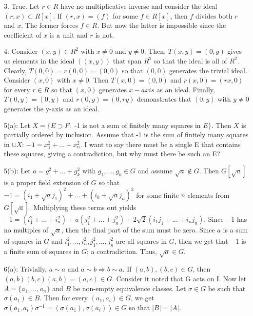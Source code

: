 \documentclass[12pt]{article}
\begin{document}
3. True. Let $r \in R$ have no multiplicative inverse and consider the ideal $(r,x) \subset R[x]$. If $(r,x)=(f)$ for some $f \in R[x]$, then $f$ divides both $r$ and $x$. The former forces $f \in R$. But now the latter is impossible since the coefficient of $x$ is a unit and $r$ is not. \newline

4: Consider $(x,y) \in R^2$ with $x \neq 0$ and $y \neq 0$. Then, $T(x,y)=(0,y)$ gives us elements in the ideal $((x,y))$ that span $R^2$ so that the ideal is all of $R^2$. Clearly, $T(0,0)=r(0,0)=(0,0)$ so that $(0,0)$ generates the trivial ideal. Consider $(x,0)$ with $x \neq 0$. Then $T(x,0)=(0,0)$ and $r(x,0)=(rx,0)$ for every $r \in R$ so that $(x,0)$ generates $x-axis$ as an ideal. Finally, $T(0,y)=(0,y)$ and $r(0,y)=(0,ry)$ demonstrates that $(0,y)$ with $y \neq 0$ generates the y-axis as an ideal. \newline

5(a): Let $X = \{ E \supset F : $ -1 is not a sum of finitely many squares in $E\}$. Then $X$ is partially ordered by inclusion. Assume that -1 is the sum of finitely many squares in $\cup X$: $-1 = x_1^2+...+x_n^2$. {\color{red} I want to say there must be a single E that contains these squares, giving a contradiction, but why must there be such an E?} \newline

5(b): Let $a = g_1^2+...+g_k^2$ with $g_1,...,g_k \in G$ and assume $\sqrt{a} \notin G$. Then $G[\sqrt{a}]$ is a proper field extension of $G$ so that $-1 = (i_1+\sqrt{a}j_1)^2+...+(i_k+\sqrt{a}j_n)^2$ for some finite $n$ elements from $G[\sqrt{a}]$. Multiplying these terms out yields $-1 = (i_1^2+...+i_n^2)+a(j_1^2+...+j_n^2)+2\sqrt{2}(i_1j_1+...+i_nj_n)$. Since $-1$ has no multiples of $\sqrt{a}$, then the final part of the sum must be zero. Since $a$ is a sum of squares in $G$ and $i_1^2,...,i_n^2,j_1^2,...,j_n^2$ are all squares in $G$, then we get that $-1$ is a finite sum of squares in $G$; a contradiction. Thus, $\sqrt{a} \in G$. \newline

6(a): Trivially, $a \sim a$ and $a \sim b \Rightarrow b \sim a$. If $(a,b),(b,c) \in G$, then $(a,b)(b,c)(a,b)=(a,c) \in G$. Consider it noted that G acts on I. Now let $A = \{a_1,...,a_n\}$ and $B$ be non-empty equivalence classes. Let $\sigma \in G$ be such that $\sigma(a_1) \in B$. Then for every $(a_1,a_i) \in G$, we get $\sigma (a_1,a_i) \sigma^{-1} = (\sigma(a_1),\sigma(a_i)) \in G$ so that $|B|=|A|$. \newline
\end{document}
